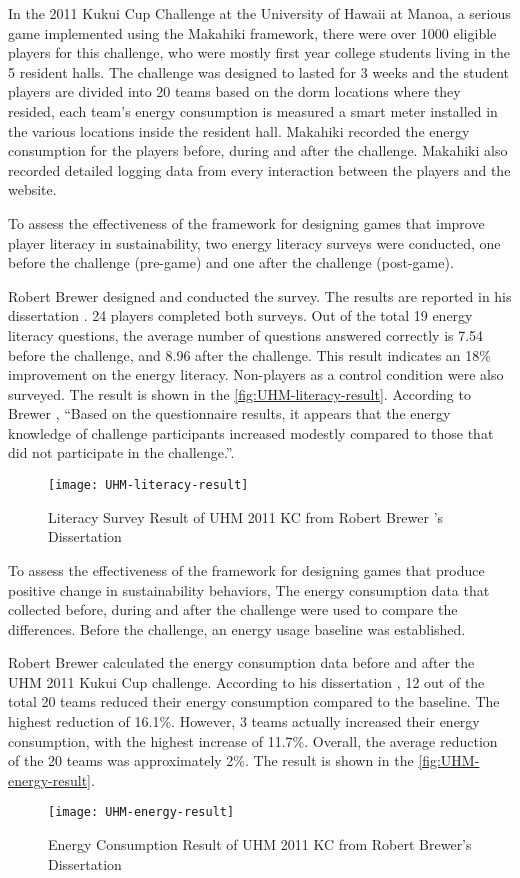 In the 2011 Kukui Cup Challenge at the University of Hawaii at Manoa, a serious game implemented using the Makahiki framework, there were over 1000 eligible players for this challenge, who were mostly first
year college students living in the 5 resident halls. The challenge was designed to lasted for 3 weeks and the student players are divided into 20 teams based on the dorm locations where they resided, each team's energy consumption is measured a smart meter installed in the various locations inside the resident hall. Makahiki recorded the energy consumption for the players before, during and after the challenge. Makahiki also recorded detailed logging data from every interaction between the players and the website. 

To assess the effectiveness of the framework for designing games that improve player literacy in sustainability, 
 two energy literacy surveys were conducted, one before the challenge (pre-game) and one after
the challenge (post-game). 

Robert Brewer designed and conducted the survey. The results are reported in his dissertation \cite{csdl2-10-08}. 24 players completed both surveys. Out of the total 19 energy literacy questions, the average number of questions answered correctly is 7.54 before the
challenge, and 8.96 after the challenge. This result indicates an 18\% improvement on the
energy literacy.  Non-players as a control condition were also surveyed. The result is shown in the \autoref{fig:UHM-literacy-result}. According to Brewer \cite{csdl2-10-08}, ``Based on the questionnaire results, it appears that the energy knowledge of challenge participants increased modestly compared to those that did not participate in the challenge.''.
\begin{figure}[ht!]
  \center
  \texttt{[image: UHM-literacy-result]}
  \caption{Literacy Survey Result of UHM 2011 KC from Robert Brewer 's Dissertation \cite{csdl2-10-08}}
  \label{fig:UHM-literacy-result}
\end{figure}

To assess the effectiveness of the framework for designing games that produce positive change in sustainability
behaviors, The energy consumption data that collected before, during and after the
challenge were used to compare the differences.  Before the challenge, an energy usage baseline was established. 

Robert Brewer calculated the energy consumption data before and after the UHM 2011 Kukui Cup challenge. According to his dissertation \cite{csdl2-10-08}, 12 out of the total 20 teams reduced their energy
consumption compared to the baseline. The highest reduction of 16.1\%. However, 3 teams actually increased
their energy consumption, with the highest increase of 11.7\%. Overall, the average
reduction of the 20 teams was approximately 2\%.  The result is shown in the \autoref{fig:UHM-energy-result}. 
\begin{figure}[ht!]
  \center
  \texttt{[image: UHM-energy-result]}
  \caption{Energy Consumption Result of UHM 2011 KC from Robert Brewer's Dissertation \cite{csdl2-10-08}}
  \label{fig:UHM-energy-result}
\end{figure}

